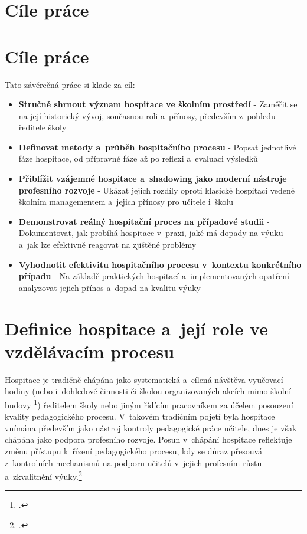 \setcounter{page}{1}

\section*{Cíle práce}

\section{Cíle práce}
Tato závěrečná práce si klade za cíl:
\begin{itemize}
\item \textbf{Stručně shrnout význam hospitace ve školním prostředí} - Zaměřit se na její historický vývoj, současnou roli a~přínosy, především z~pohledu ředitele školy
\item \textbf{Definovat metody a~průběh hospitačního procesu} - Popsat jednotlivé fáze hospitace, od přípravné fáze až po reflexi a~evaluaci výsledků
\item \textbf{Přiblížit vzájemné hospitace a~shadowing jako moderní nástroje profesního rozvoje} - Ukázat jejich rozdíly oproti klasické hospitaci vedené školním managementem a~jejich přínosy pro učitele i~školu
\item \textbf{Demonstrovat reálný hospitační proces na případové studii} - Dokumentovat, jak probíhá hospitace v~praxi, jaké má dopady na výuku a~jak lze efektivně reagovat na zjištěné problémy
\item \textbf{Vyhodnotit efektivitu hospitačního procesu v~kontextu konkrétního případu} - Na základě praktických hospitací a~implementovaných opatření analyzovat jejich přínos a~dopad na kvalitu výuky
\end{itemize}
\newpage

\section{Definice hospitace a~její role ve vzdělávacím procesu}

Hospitace je tradičně chápána jako systematická a~cílená návštěva vyučovací hodiny (nebo i~dohledové činnosti či školou organizovaných akcích mimo školní budovy \footcite[14]{hospitace-funkce}) ředitelem školy nebo jiným řídícím pracovníkem za účelem posouzení kvality pedagogického procesu. V~takovém tradičním pojetí byla hospitace vnímána především jako nástroj kontroly pedagogické práce učitele, dnes je však chápána jako podpora profesního rozvoje. Posun v~chápání hospitace reflektuje změnu přístupu k~řízení pedagogického procesu, kdy se důraz přesouvá z~kontrolních mechanismů na podporu učitelů v~jejich profesním růstu a~zkvalitnění výuky.\footcite[139]{ped-proces-rizeni}

